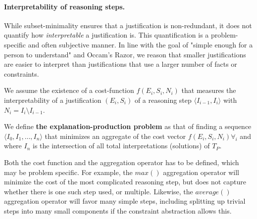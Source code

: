 
\paragraph{Interpretability of reasoning steps.}
While subset-minimality ensures that a justification is non-redundant, it does not quantify how \textit{interpretable} a justification is. 
This quantification is a problem-specific and often subjective manner. In line with the goal of "simple enough for a person to understand" and Occam's Razor, we reason that smaller justifications are easier to interpret than justifications that use a larger number of facts or constraints. %

We assume the existence of a cost-function $f(E_i,S_i,N_i)$ that measures the interpretability of a justification $(E_i,S_i)$ of a reasoning step $\langle I_{i-1}, I_i \rangle$ with $N_i = I_i \setminus I_{i-1}$.

We define \textbf{the explanation-production problem} as that of finding a sequence $\langle I_0, I_1, \ldots, I_n \rangle$ that minimizes an aggregate of the cost vector $f(E_i,S_i,N_i) \forall_i$ and where $I_n$ is the intersection of all total interpretations (solutions) of $T_P$. 

Both the cost function and the aggregation operator has to be defined, which may be problem specific. For example, the $max()$ aggregation operator will minimize the cost of the most complicated reasoning step, but does not capture whether there is one such step used, or multiple. Likewise, the $average()$ aggregation operator will favor many simple steps, including splitting up trivial steps into many small components if the constraint abstraction allows this.


